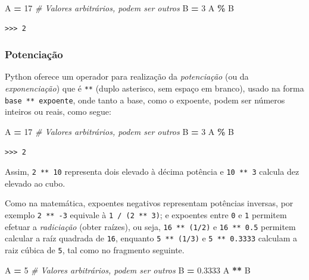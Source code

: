 \documentclass[
]{book}
\newenvironment{Shaded}{\begin{snugshade}}{\end{snugshade}}
\newcommand{\CommentTok}[1]{\textcolor[rgb]{0.56,0.35,0.01}{\textit{#1}}}
\newcommand{\DecValTok}[1]{\textcolor[rgb]{0.00,0.00,0.81}{#1}}
\newcommand{\FloatTok}[1]{\textcolor[rgb]{0.00,0.00,0.81}{#1}}
\newcommand{\NormalTok}[1]{#1}
\newcommand{\OperatorTok}[1]{\textcolor[rgb]{0.81,0.36,0.00}{\textbf{#1}}}
\begin{document}
\begin{Shaded}
\begin{Highlighting}[]
\NormalTok{A }\OperatorTok{=} \DecValTok{17} \CommentTok{\# Valores arbitrários, podem ser outros}
\NormalTok{B }\OperatorTok{=} \DecValTok{3}
\NormalTok{A }\OperatorTok{\%}\NormalTok{ B}
\end{Highlighting}
\end{Shaded}

\begin{verbatim}
>>> 2
\end{verbatim}

\hypertarget{potenciauxe7uxe3o}{%
\subsubsection{Potenciação}\label{potenciauxe7uxe3o}}

Python oferece um operador para realização da \emph{potenciação} (ou da \emph{exponenciação}) que é \texttt{**} (duplo asterisco, sem espaço em branco), usado na forma \texttt{base\ **\ expoente}, onde tanto a base, como o expoente, podem ser números inteiros ou reais, como segue:

\begin{Shaded}
\begin{Highlighting}[]
\NormalTok{A }\OperatorTok{=} \DecValTok{17} \CommentTok{\# Valores arbitrários, podem ser outros}
\NormalTok{B }\OperatorTok{=} \DecValTok{3}
\NormalTok{A }\OperatorTok{\%}\NormalTok{ B}
\end{Highlighting}
\end{Shaded}

\begin{verbatim}
>>> 2
\end{verbatim}

Assim, \texttt{2\ **\ 10} representa dois elevado à décima potência e \texttt{10\ **\ 3} calcula dez elevado ao cubo.

Como na matemática, expoentes negativos representam potências inversas, por exemplo \texttt{2\ **\ -3} equivale à \texttt{1\ /\ (2\ **\ 3)}; e expoentes entre \texttt{0} e \texttt{1} permitem efetuar a \emph{radiciação} (obter raízes), ou seja, \texttt{16\ **\ (1/2)} e \texttt{16\ **\ 0.5} permitem calcular a raíz quadrada de \texttt{16}, enquanto \texttt{5\ **\ (1/3)} e \texttt{5\ **\ 0.3333} calculam a raiz cúbica de \texttt{5}, tal como no fragmento seguinte.

\begin{Shaded}
\begin{Highlighting}[]
\NormalTok{A }\OperatorTok{=} \DecValTok{5} \CommentTok{\# Valores arbitrários, podem ser outros}
\NormalTok{B }\OperatorTok{=} \FloatTok{0.3333}
\NormalTok{A }\OperatorTok{**}\NormalTok{ B}
\end{Highlighting}
\end{Shaded}
\end{document}
